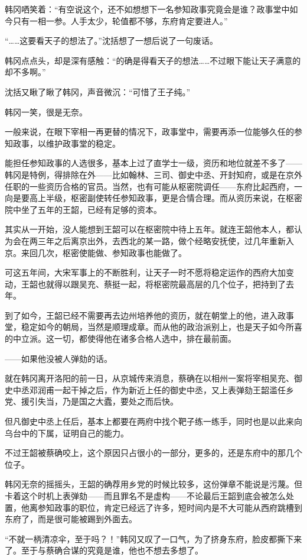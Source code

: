 韩冈哂笑着：“有空说这个，还不如想想下一名参知政事究竟会是谁？政事堂中如今只有一相一参。人手太少，轮值都不够，东府肯定要进人。”

“……这要看天子的想法了。”沈括想了一想后说了一句废话。

韩冈点点头，却是深有感触：“的确是得看天子的想法……不过眼下能让天子满意的却不多啊。”

沈括又瞅了瞅了韩冈，声音微沉：“可惜了王子纯。”

韩冈一笑，很是无奈。

一般来说，在眼下宰相一再更替的情况下，政事堂中，需要再添一位能够久任的参知政事，以维护政事堂的稳定。

能担任参知政事的人选很多，基本上过了直学士一级，资历和地位就差不多了——韩冈是特例，得排除在外——比如翰林、三司、御史中丞、开封知府，或是在京外任职的一些资历合格的官员。当然，也有可能从枢密院调任——东府比起西府，一向是要高上半级，枢密副使转任参知政事，更是合情合理。而从资历来说，在枢密院中坐了五年的王韶，已经有足够的资本。

其实从一开始，没人能想到王韶可以在枢密院中待上五年。就连王韶他本人，都认为会在两三年之后离京出外，去西北的某一路，做个经略安抚使，过几年重新入京。来回几次，枢密使能做、参知政事也能做了。

可这五年间，大宋军事上的不断胜利，让天子一时不愿将稳定运作的西府大加变动，王韶也就得以跟吴充、蔡挺一起，将枢密院最高层的几个位子，把持到了去年。

到了如今，王韶已经不需要再去边州培养他的资历，就在朝堂上的他，进入政事堂，稳定如今的朝局，当然是顺理成章。而从他的政治派别上，也是天子如今所喜的中立派。这一切，都使得他在诸多合格人选中，排在最前面。

——如果他没被人弹劾的话。

就在韩冈离开洛阳的前一日，从京城传来消息，蔡确在以相州一案将宰相吴充、御史中丞邓润甫一起干掉之后，作为新近上任的御史中丞，又上表弹劾王韶滥任乡党、援引失当，乃是国之大蠹，要处之而后快。

但凡御史中丞上任后，基本上都要在两府中找个靶子练一练手，同时也是以此来向乌台中的下属，证明自己的能力。

不过王韶被蔡确咬上，这个原因只占很小的一部分，更多的，还是东府中的那几个位子。

韩冈无奈的摇摇头，王韶的确荐用乡党的时候比较多，这份弹章不能说是污蔑。但卡着这个时机上表弹劾——而且罪名不是虚构——不论最后王韶到底会被怎么处置，他离参知政事的职位，肯定已经远了许多，短时间内是不大可能从西府跳槽到东府了，而是很可能被踢到外面去。

“不就一柄清凉伞，至于吗？！”韩冈又叹了一口气，为了挤身东府，脸皮都撕下来了。至于与蔡确合谋的究竟是谁，他也不想去多想了。


